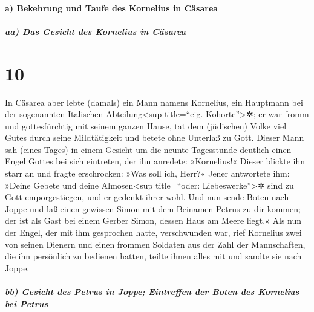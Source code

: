 \hypertarget{a-bekehrung-und-taufe-des-kornelius-in-cuxe4sarea}{%
\paragraph{a) Bekehrung und Taufe des Kornelius in
Cäsarea}\label{a-bekehrung-und-taufe-des-kornelius-in-cuxe4sarea}}

\hypertarget{aa-das-gesicht-des-kornelius-in-cuxe4sarea}{%
\subparagraph{aa) Das Gesicht des Kornelius in
Cäsarea}\label{aa-das-gesicht-des-kornelius-in-cuxe4sarea}}

\hypertarget{section-9}{%
\section{10}\label{section-9}}

 In Cäsarea aber lebte (damals) ein Mann namens Kornelius,
ein Hauptmann bei der sogenannten Italischen Abteilung\textless sup
title=``eig. Kohorte''\textgreater✲;  er war fromm und
gottesfürchtig mit seinem ganzen Hause, tat dem (jüdischen) Volke viel
Gutes durch seine Mildtätigkeit und betete ohne Unterlaß zu Gott.
 Dieser Mann sah (eines Tages) in einem Gesicht um die
neunte Tagesstunde deutlich einen Engel Gottes bei sich eintreten, der
ihn anredete: »Kornelius!«  Dieser blickte ihn starr an
und fragte erschrocken: »Was soll ich, Herr?« Jener antwortete ihm:
»Deine Gebete und deine Almosen\textless sup title=``oder:
Liebeswerke''\textgreater✲ sind zu Gott emporgestiegen, und er gedenkt
ihrer wohl.  Und nun sende Boten nach Joppe und laß einen
gewissen Simon mit dem Beinamen Petrus zu dir kommen;  der
ist als Gast bei einem Gerber Simon, dessen Haus am Meere liegt.«
 Als nun der Engel, der mit ihm gesprochen hatte,
verschwunden war, rief Kornelius zwei von seinen Dienern und einen
frommen Soldaten aus der Zahl der Mannschaften, die ihn persönlich zu
bedienen hatten,  teilte ihnen alles mit und sandte sie
nach Joppe.

\hypertarget{bb-gesicht-des-petrus-in-joppe-eintreffen-der-boten-des-kornelius-bei-petrus}{%
\subparagraph{bb) Gesicht des Petrus in Joppe; Eintreffen der Boten des
Kornelius bei
Petrus}\label{bb-gesicht-des-petrus-in-joppe-eintreffen-der-boten-des-kornelius-bei-petrus}}

